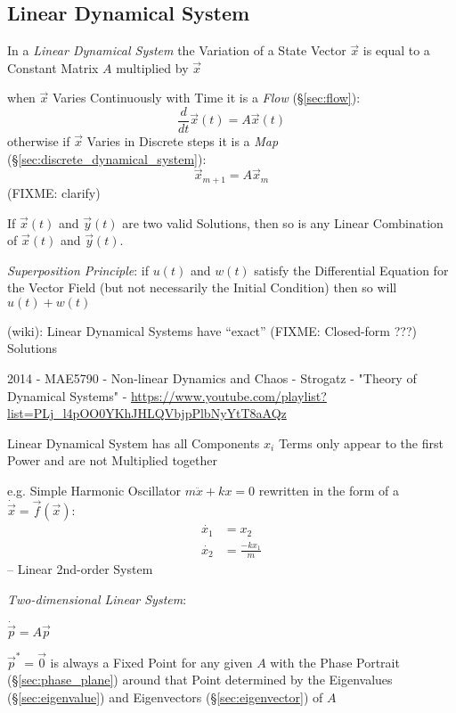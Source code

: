 \subsection{Linear Dynamical System}\label{sec:linear_dynamical_system}

In a \emph{Linear Dynamical System} the Variation of a State Vector $\vec{x}$
is equal to a Constant Matrix $A$ multiplied by $\vec{x}$

when $\vec{x}$ Varies Continuously with Time it is a \emph{Flow}
(\S\ref{sec:flow}):
\[
  \frac{d}{dt}\vec{x}(t) = A\vec{x}(t)
\]
otherwise if $\vec{x}$ Varies in Discrete steps it is a \emph{Map}
(\S\ref{sec:discrete_dynamical_system}):
\[
  \vec{x}_{m+1} = A\vec{x}_m
\]
(FIXME: clarify)

If $\vec{x}(t)$ and $\vec{y}(t)$ are two valid Solutions, then so is any Linear
Combination of $\vec{x}(t)$ and $\vec{y}(t)$.

\emph{Superposition Principle}: if $u(t)$ and $w(t)$ satisfy the Differential
Equation for the Vector Field (but not necessarily the Initial Condition) then
so will $u(t) + w(t)$

(wiki): Linear Dynamical Systems have ``exact'' (FIXME: Closed-form ???)
Solutions

\asterism

2014 - MAE5790 - Non-linear Dynamics and Chaos - Strogatz - "Theory of
Dynamical Systems" -
\url{https://www.youtube.com/playlist?list=PLj_l4pOO0YKhJHLQVbjpPlbNyYtT8aAQz}

Linear Dynamical System has all Components $x_i$ Terms only appear to the first
Power and are not Multiplied together

e.g. Simple Harmonic Oscillator $m\ddot{x} + kx = 0$
rewritten in the form of a $\dot{\vec{x}} = \vec{f}(\vec{x})$:
\begin{align*}
  \dot{x_1} & = x_2 \\
  \dot{x_2} & = \frac{-kx_1}{m}
\end{align*}
-- Linear 2nd-order System

\emph{Two-dimensional Linear System}:

$\dot{\vec{p}} = A\vec{p}$

$\vec{p}^* = \vec{0}$ is always a Fixed Point for any given $A$ with the Phase
Portrait (\S\ref{sec:phase_plane}) around that Point determined by the
Eigenvalues (\S\ref{sec:eigenvalue}) and Eigenvectors (\S\ref{sec:eigenvector})
of $A$

